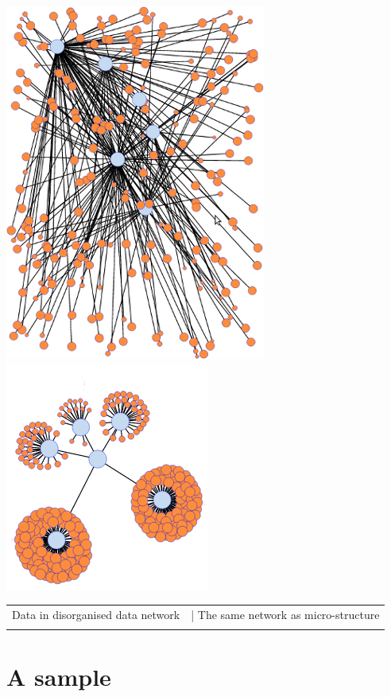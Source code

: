 \documentclass[15pt]{article}
\begin{document}
\includegraphics[scale=0.5]{img/normal-knowledge.png}
\includegraphics[scale=0.9]{img/micro-structure.png}


\vskip 0.4cm

    \begin{tabular}{cc}
    Data in disorganised data network           &|    The same network as micro-structure\\
    \\

    \end{tabular}

\section{A sample}
\end{document}

